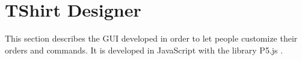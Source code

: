 \section{TShirt Designer}

This section describes the GUI developed in order to let people customize their orders and commands. It is developed in JavaScript with the library P5.js \cite{P5_doc}. 